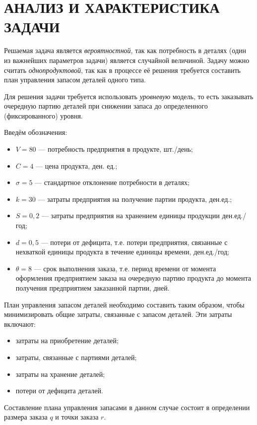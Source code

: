 \section{АНАЛИЗ И ХАРАКТЕРИСТИКА ЗАДАЧИ}

Решаемая задача является \textit{вероятностной}, так как потребность в
деталях (один из важнейших параметров задачи) является случайной величиной.
Задачу можно считать \textit{однопродуктовой}, так как в процессе её решения
требуется составить план управления запасом деталей одного типа.

Для решения задачи требуется использовать \textit{уровневую} модель, то есть
заказывать очередную партию деталей при снижении запаса до определенного
(фиксированного) уровня.

Введём обозначения:
\begin{itemize}
  \item $V=80$ --- потребность предприятия в продукте, шт./день;
  \item $C=4$ --- цена продукта, ден. ед.;
  \item $\sigma=5$ --- стандартное отклонение потребности в деталях;
  \item $k=30$ --- затраты предприятия на получение партии продукта, ден.ед.;
  \item $S=0{,}2$ --- затраты предприятия на хранением единицы продукции ден.ед./год;
  \item $d=0{,}5$ --- потери от дефицита, т.е. потери предприятия, связанные с нехваткой
    единицы продукта в течение единицы времени, ден.ед./год;
  \item $\theta=8$ --- срок выполнения заказа, т.е. период времени от момента
    оформления предприятием заказа на очередную партию продукта
    до момента получения предприятием заказанной партии, дней.
\end{itemize}

План управления запасом деталей необходимо составить таким образом,
чтобы минимизировать общие затраты, связанные с запасом деталей.
Эти затраты включают:
\begin{itemize}
  \item затраты на приобретение деталей;
  \item затраты, связанные с партиями деталей;
  \item затраты на хранение деталей;
  \item потери от дефицита деталей.
\end{itemize}

Составление плана управления запасами в данном случае состоит в определении
размера заказа $q$ и точки заказа $r$.
